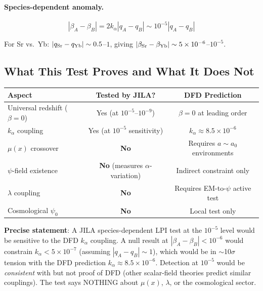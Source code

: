 \documentclass[11pt]{article}
\begin{document}
\paragraph{Species-dependent anomaly.}
\begin{equation}
|\beta_A - \beta_B| = 2k_\alpha |q_A - q_B|
\sim 10^{-5} |q_A - q_B|
\end{equation}

For Sr vs.\ Yb: $|q_{\rm Sr} - q_{\rm Yb}| \sim 0.5$--$1$, giving
$|\beta_{\rm Sr} - \beta_{\rm Yb}| \sim 5 \times 10^{-6}$--$10^{-5}$.

\subsection{What This Test Proves and What It Does Not}

\begin{table}[h]
\centering
\begin{tabular}{lcc}
\toprule
\textbf{Aspect} & \textbf{Tested by JILA?} & \textbf{DFD Prediction} \\
\midrule
Universal redshift ($\beta = 0$) & Yes (at $10^{-5}$--$10^{-9}$) &
  $\beta = 0$ at leading order \\
$k_\alpha$ coupling & Yes (at $10^{-5}$ sensitivity) &
  $k_\alpha \approx 8.5 \times 10^{-6}$ \\
$\mu(x)$ crossover & \textbf{No} &
  Requires $a \sim a_0$ environments \\
$\psi$-field existence & \textbf{No} (measures $\alpha$-variation) &
  Indirect constraint only \\
$\lambda$ coupling & \textbf{No} & Requires EM-to-$\psi$ active test \\
Cosmological $\psi_0$ & \textbf{No} & Local test only \\
\bottomrule
\end{tabular}
\end{table}

\begin{tcolorbox}[colback=blue!5!white, colframe=blue!70!black]
\textbf{Precise statement}: A JILA species-dependent LPI test at the
$10^{-5}$ level would be sensitive to the DFD $k_\alpha$ coupling.
A null result at $|\beta_A - \beta_B| < 10^{-6}$ would constrain
$k_\alpha < 5 \times 10^{-7}$ (assuming $|q_A - q_B| \sim 1$), which
would be in $\sim$10$\sigma$ tension with the DFD prediction
$k_\alpha \approx 8.5 \times 10^{-6}$. Detection at $10^{-5}$ would
be \emph{consistent} with but not proof of DFD (other scalar-field
theories predict similar couplings). The test says NOTHING about
$\mu(x)$, $\lambda$, or the cosmological sector.
\end{tcolorbox}
\end{document}
